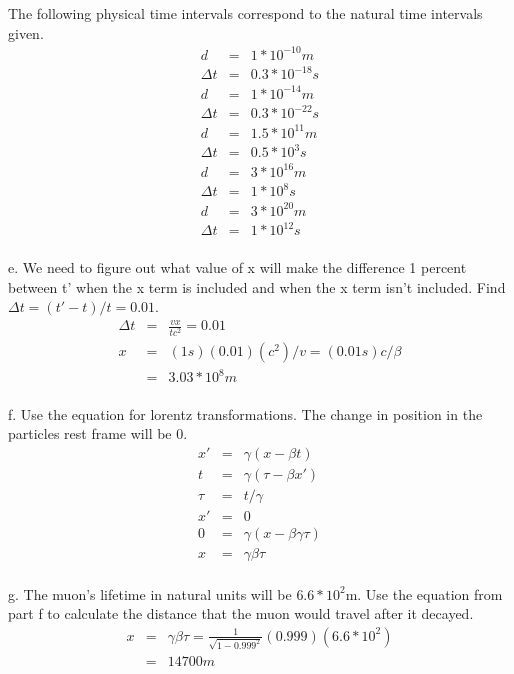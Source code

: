 \documentclass[11pt]{amsart}
\begin{document}
The following physical time intervals correspond to the natural time intervals given. \\
\begin{eqnarray*} 
d &=& 1*10^{-10}m \\
\Delta{t} &=& 0.3*10^{-18}s \\
d &=& 1*10^{-14}m \\
\Delta{t} &=& 0.3*10^{-22}s \\
d &=& 1.5*10^{11}m \\
\Delta{t} &=& 0.5*10^{3}s \\
d &=& 3*10^{16}m \\
\Delta{t} &=& 1*10^{8}s \\
d &=& 3*10^{20}m \\
\Delta{t} &=& 1*10^{12}s
\end{eqnarray*} \\
e. We need to figure out what value of x will make the difference 1 percent between t' when the x term is included and when the x term isn't included. Find $\Delta{t}=(t'-t)/t=0.01$. \\
\begin{eqnarray*}
\Delta{t} &=& \frac{vx}{tc^{2}} = 0.01 \\
x &=& (1s)(0.01)(c^{2})/v = (0.01s)c/\beta \\
&=& 3.03*10^{8}m 
\end{eqnarray*} \\
f. Use the equation for lorentz transformations. The change in position in the particles rest frame will be 0. \\
\begin{eqnarray*} 
x' &=& \gamma(x-\beta{t}) \\
t &=& \gamma(\tau-\beta{x'}) \\
\tau &=& t/\gamma \\
x' &=& 0 \\
0 &=& \gamma(x-\beta{\gamma\tau}) \\
x &=& \gamma\beta\tau 
\end{eqnarray*} \\
g. The muon's lifetime in natural units will be $6.6*10^{2}$m. Use the equation from part f to calculate the distance that the muon would travel after it decayed. \\
\begin{eqnarray*} 
x &=& \gamma\beta\tau = \frac{1}{\sqrt{1-0.999^{2}}}(0.999)(6.6*10^{2}) \\
&=& 14700m 
\end{eqnarray*} \\
\end{document}
